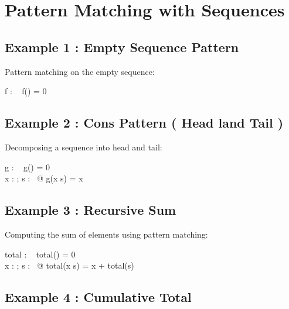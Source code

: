 \documentclass[a4paper,10pt,fleqn]{article}
\begin{document}
\section*{Pattern Matching with Sequences}

\subsection*{Example 1 : Empty Sequence Pattern}

\noindent Pattern matching on the empty sequence:

\bigskip

\begin{axdef}
f : \seq~\nat \fun \nat
\where
f(\langle \rangle) = 0
\end{axdef}

\subsection*{Example 2 : Cons Pattern ( Head land Tail )}

\noindent Decomposing a sequence into head and tail:

\bigskip

\begin{axdef}
g : \seq~\nat \fun \nat
\where
g(\langle \rangle) = 0 \\
\forall x : \nat; s : \seq~\nat @ g(\langle x \rangle \cat s) = x
\end{axdef}

\subsection*{Example 3 : Recursive Sum}

\noindent Computing the sum of elements using pattern matching:

\bigskip

\begin{axdef}
total : \seq~\nat \fun \nat
\where
total(\langle \rangle) = 0 \\
\forall x : \nat; s : \seq~\nat @ total(\langle x \rangle \cat s) = x + total(s)
\end{axdef}

\subsection*{Example 4 : Cumulative Total}
\end{document}
